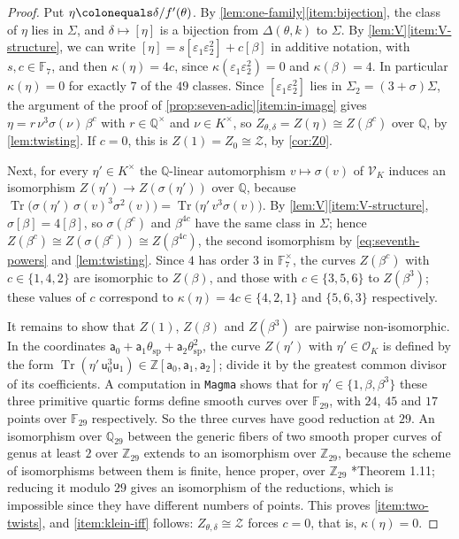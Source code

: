 \documentclass[12pt]{amsart}
\newcommand{\F}{{\mathbb F}}
\newcommand{\Q}{\mathbb{Q}}
\newcommand{\Z}{\mathbb{Z}}
\newcommand{\calV}{{\mathcal V}}
\newcommand{\calZ}{{\mathcal Z}}
\newcommand{\OO}{{\mathcal O}}
\newcommand{\sfa}{\mathsf{a}}
\newcommand{\sfu}{\mathsf{u}}
\DeclareMathOperator{\spc}{sp}
\DeclareMathOperator{\Tr}{Tr}
\newcommand{\Magma}{\texttt{Magma}\xspace}
\numberwithin{equation}{section}
\theoremstyle{definition}
\begin{document}
\begin{proof}
  Put $\eta \colonequals \delta/f'(\theta)$. By
  \cref{lem:one-family}\eqref{item:bijection}, the class of $\eta$ lies in
  $\Sigma$, and $\delta \mapsto [\eta]$ is a bijection from $\Delta(\theta,k)$ to
  $\Sigma$. By \cref{lem:V}\eqref{item:V-structure}, we can write $[\eta] =
  s[\varepsilon_1\varepsilon_2^{2}] + c[\beta]$ in additive notation, with $s, c
  \in \F_7$, and then $\kappa(\eta) = 4c$, since $\kappa(\varepsilon_1\varepsilon_2^{2})
  = 0$ and $\kappa(\beta) = 4$. In particular $\kappa(\eta) = 0$ for exactly $7$
  of the $49$ classes. Since $[\varepsilon_1\varepsilon_2^{2}]$ lies in
  $\Sigma_2 = (3+\sigma)\Sigma$, the argument of the proof of
  \cref{prop:seven-adic}\eqref{item:in-image} gives $\eta = r\,\nu^{3}\sigma(\nu)\,\beta^{c}$ with $r
  \in \Q^{\times}$ and $\nu \in K^{\times}$, so $Z_{\theta,\delta} =
  Z(\eta) \cong Z(\beta^{c})$ over $\Q$, by \cref{lem:twisting}. If $c = 0$, this
  is $Z(1) = Z_0 \cong \calZ$, by \cref{cor:Z0}.

  Next, for every $\eta' \in K^{\times}$ the $\Q$-linear automorphism $v
  \mapsto \sigma(v)$ of $\calV_K$ induces an isomorphism $Z(\eta') \to
  Z(\sigma(\eta'))$ over $\Q$, because
  $\Tr\bigl(\sigma(\eta')\,\sigma(v)^{3}\sigma^{2}(v)\bigr) =
  \Tr\bigl(\eta'\,v^{3}\sigma(v)\bigr)$. By \cref{lem:V}\eqref{item:V-structure},
  $\sigma[\beta] = 4[\beta]$, so $\sigma(\beta^{c})$ and $\beta^{4c}$ have the same class
  in $\Sigma$; hence $Z(\beta^{c}) \cong Z(\sigma(\beta^{c})) \cong Z(\beta^{4c})$, the
  second isomorphism by \cref{eq:seventh-powers} and \cref{lem:twisting}. Since $4$ has order $3$ in $\F_7^{\times}$, the curves
  $Z(\beta^{c})$ with $c \in \{1,4,2\}$ are isomorphic to $Z(\beta)$, and those with $c
  \in \{3,5,6\}$ to $Z(\beta^{3})$; these values of $c$ correspond to $\kappa(\eta)
  = 4c \in \{4,2,1\}$ and $\{5,6,3\}$ respectively.

  It remains to show that $Z(1)$, $Z(\beta)$ and $Z(\beta^{3})$ are pairwise
  non-isomorphic. In the coordinates $\sfa_0 + \sfa_1\theta_{\spc} +
  \sfa_2\theta_{\spc}^{2}$, the curve $Z(\eta')$ with $\eta' \in \OO_K$ is defined
  by the form $\Tr(\eta'\,\sfu_0^{3}\sfu_1) \in \Z[\sfa_0,\sfa_1,\sfa_2]$; divide it by the
  greatest common divisor of its coefficients. A computation in \Magma{} shows
  that for $\eta' \in \{1, \beta, \beta^{3}\}$ these three primitive quartic forms
  define smooth curves over $\F_{29}$, with $24$, $45$ and $17$ points over
  $\F_{29}$ respectively. So the three curves have good reduction at $29$. An
  isomorphism over $\Q_{29}$ between the generic fibers of two smooth proper
  curves of genus at least $2$ over $\Z_{29}$ extends to an isomorphism over $\Z_{29}$, because the scheme
  of isomorphisms between them is finite, hence proper, over $\Z_{29}$
  \cite{DM-69}*{Theorem 1.11}; reducing it modulo $29$ gives an isomorphism of the
  reductions, which is impossible since they have different numbers of points.
  This proves \eqref{item:two-twists}, and \eqref{item:klein-iff} follows:
  $Z_{\theta,\delta} \cong \calZ$ forces $c = 0$, that is, $\kappa(\eta) = 0$.
\end{proof}
\end{document}
